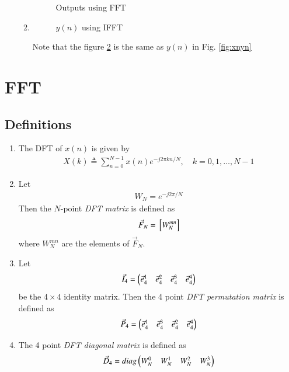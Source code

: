 \documentclass[journal,12pt,twocolumn]{IEEEtran}
\renewcommand\thesection{\arabic{section}}
\begin{document}
\begin{enumerate}[label=\thesection.\arabic*]
\begin{enumerate}
				\begin{figure}[!ht]
					\centering
					\caption{Outputs using FFT}
					\label{fig:fft}
				\end{figure}
				\item 
				\begin{figure}[!ht]
					\centering
					\caption{$y(n)$ using IFFT}
					\label{fig:ifft}
				\end{figure}
				Note that the figure \ref{fig:ifft} is the same as $y(n)$ in Fig. \ref{fig:xnyn}
			\end{enumerate}
		\end{enumerate}
		\vspace{2cm}
		\section{FFT}
		\subsection{Definitions}
		\begin{enumerate}[label=\arabic*.,ref=\thesection.\theenumi]
			\item The DFT of $x(n)$ is given by
			\begin{align}
				X(k) \triangleq \sum_{n=0}^{N-1} x(n) e^{-j 2 \pi k n / N}, \quad k=0,1, \ldots, N-1
			\end{align}
			\item Let 
			\begin{align}
				W_{N} = e^{-j2\pi/N} 
			\end{align}
			Then the $N$-point {\em DFT matrix} is defined as 
			\begin{align}
				\vec{F}_{N} = {}\left[W_{N}^{mn}\right]
			\end{align}
			where $W_{N}^{mn}$ are the elements of $\vec{F}_{N}$.
			\item Let 
			\begin{align}
				\vec{I}_4 = \begin{pmatrix}\vec{e}_4^{1} &\vec{e}_4^{2} &\vec{e}_4^{3} &\vec{e}_4^{4} \end{pmatrix}
			\end{align}
			be the $4\times 4$ identity matrix.  Then the 4 point {\em DFT permutation matrix} is defined as 
			\begin{align}
				\vec{P}_4 = \begin{pmatrix}\vec{e}_4^{1} &\vec{e}_4^{3} &\vec{e}_4^{2} &\vec{e}_4^{4}\end{pmatrix}
			\end{align}
			\item The 4 point {\em DFT diagonal matrix} is defined as 
			\begin{align}
				\vec{D}_4 = diag\begin{pmatrix}W_{N}^{0} & W_{N}^{1} & W_{N}^{2} & W_{N}^{3}\end{pmatrix}
			\end{align}
		\end{enumerate}
\end{document}
